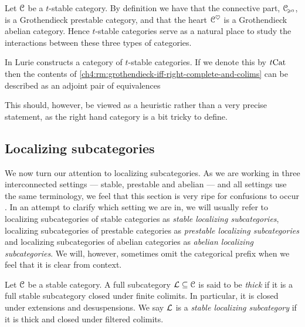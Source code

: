 \begin{remark}
    Let $\EuScript{C}$ be a $t$-stable category. By definition we have that the connective part, $\EuScript{C}_{\hspace{-1pt}\scriptscriptstyle\geqslant 0}$, is a Grothendieck prestable category, and that the heart $\EuScript{C}^\heartsuit$ is a Grothendieck abelian category. Hence $t$-stable categories serve as a natural place to study the interactions between these three types of categories. 
\end{remark}

\begin{remark}
    In \cite[Section C.3.1]{lurie_SAG} Lurie constructs a category of $t$-stable categories. If we denote this by $t\mathrm{Cat}$ then the contents of \cref{ch4:rm:grothendieck-iff-right-complete-and-colims} can be described as an adjoint pair of equivalences
    \begin{center}
    \end{center}
    This should, however, be viewed as a heuristic rather than a very precise statement, as the right hand category is a bit tricky to define. 
\end{remark}







\subsection{Localizing subcategories}
\label{ch4:ssec:localizing-subcategories}

We now turn our attention to localizing subcategories. As we are working in three interconnected settings --- stable, prestable and abelian --- and all settings use the same terminology, we feel that this section is very ripe for confusions to occur . In an attempt to clarify which setting we are in, we will usually refer to localizing subcategories of stable categories as \emph{stable localizing subcategories}, localizing subcategories of prestable categories as \emph{prestable localizing subcategories} and localizing subcategories of abelian categories as \emph{abelian localizing subcategories}. We will, however, sometimes omit the categorical prefix when we feel that it is clear from context. 

\begin{definition}
    Let $\EuScript{C}$ be a stable category. A full subcategory $\mathcal{L}\subseteq \EuScript{C}$ is said to be \emph{thick} if it is a full stable subcategory closed under finite colimits. In particular, it is closed under extensions and desuspensions. We say $\mathcal{L}$ is a \emph{stable localizing subcategory} if it is thick and closed under filtered colimits. 
\end{definition}

